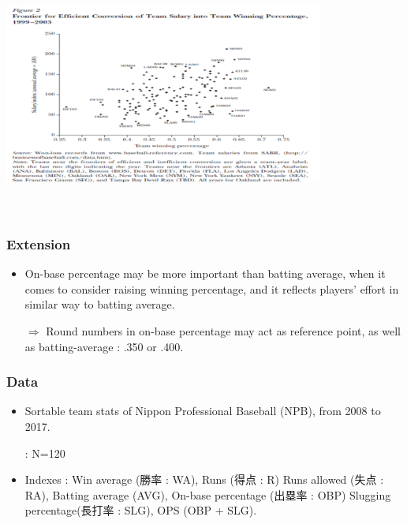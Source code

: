 \documentclass[dvipdfmx,12pt]{beamer}
\begin{document}
\begin{frame}

\begin{center}

\includegraphics[width=10.5cm,height=8cm]{Hakes_Sauer_F2.pdf}

\end{center}

\end{frame}

\begin{frame}\frametitle{Extension}

 \begin{itemize}
 
 \item On-base percentage may be more important than batting average, when it comes to consider raising winning percentage, and it reflects players' effort in similar way to batting average.
 
 $\Rightarrow$ Round numbers in on-base percentage may act as reference point, as well as batting-average : .350 or .400.
 
 \end{itemize}

\end{frame}

\begin{frame}\frametitle{Data}

 \begin{itemize}
 
 \item Sortable team stats of Nippon Professional Baseball (NPB), from 2008 to 2017.
 
 : N=120
 
 \item Indexes : Win average (勝率 : WA), Runs (得点 : R) Runs allowed (失点 : RA), Batting average (AVG),
 On-base percentage (出塁率 : OBP) Slugging percentage(長打率 : SLG), OPS (OBP + SLG).
 
 \end{itemize}

\end{frame}
\end{document}
